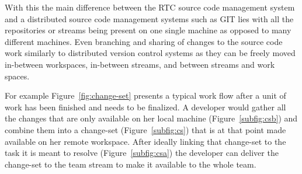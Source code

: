 With this the main difference between the RTC source code management system and a distributed source code management systems such as GIT lies with all the repositories or streams being present on one single machine as opposed to many different machines.
Even branching and sharing of changes to the source code work similarly to distributed version control systems as they can be freely moved in-between workspaces, in-between streams, and between streams and work spaces.

For example Figure~\ref{fig:change-set} presents a typical work flow after a unit of work has been finished and needs to be finalized.
A developer would gather all the changes that are only available on her local machine (Figure~\ref{subfig:csb}) and combine them into a change-set (Figure~\ref{subfig:cs}) that is at that point made available on her remote workspace.
After ideally linking that change-set to the task it is meant to resolve (Figure~\ref{subfig:csa}) the developer can deliver the change-set to the team stream to make it available to the whole team.

